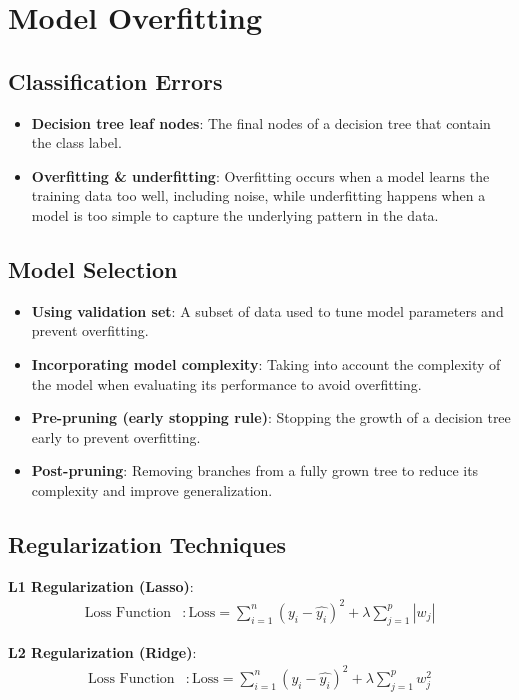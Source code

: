 \documentclass{article}
\begin{document}
\section{Model Overfitting}

\subsection{Classification Errors}
\begin{itemize}
    \item \textbf{Decision tree leaf nodes}: The final nodes of a decision tree that contain the class label.
    \item \textbf{Overfitting \& underfitting}: Overfitting occurs when a model learns the training data too well, including noise, while underfitting happens when a model is too simple to capture the underlying pattern in the data.
\end{itemize}

\subsection{Model Selection}
\begin{itemize}
    \item \textbf{Using validation set}: A subset of data used to tune model parameters and prevent overfitting.
    \item \textbf{Incorporating model complexity}: Taking into account the complexity of the model when evaluating its performance to avoid overfitting.
    \item \textbf{Pre-pruning (early stopping rule)}: Stopping the growth of a decision tree early to prevent overfitting.
    \item \textbf{Post-pruning}: Removing branches from a fully grown tree to reduce its complexity and improve generalization.
\end{itemize}

\subsection{Regularization Techniques}
\textbf{L1 Regularization (Lasso)}:
\begin{align*}
    \text{Loss Function} &: \text{Loss} = \sum_{i=1}^{n} (y_i - \hat{y_i})^2 + \lambda \sum_{j=1}^{p} |w_j|
\end{align*}

\textbf{L2 Regularization (Ridge)}:
\begin{align*}
    \text{Loss Function} &: \text{Loss} = \sum_{i=1}^{n} (y_i - \hat{y_i})^2 + \lambda \sum_{j=1}^{p} w_j^2
\end{align*}
\end{document}
